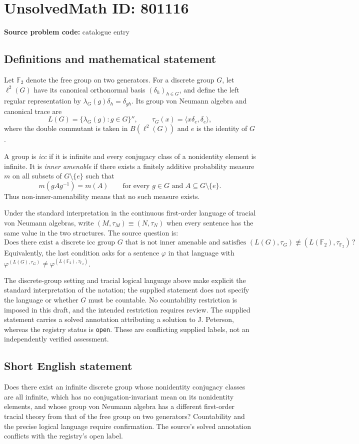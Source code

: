 \documentclass[11pt]{article}
\begin{document}
\section*{UnsolvedMath ID: 801116}
\textbf{Source problem code:} catalogue entry
\subsection{Definitions and mathematical statement}
Let \(\mathbb F_2\) denote the free group on two generators. For a discrete group \(G\), let \(\ell^2(G)\) have its canonical orthonormal basis \((\delta_h)_{h\in G}\), and define the left regular representation by \(\lambda_G(g)\delta_h=\delta_{gh}\). Its group von Neumann algebra and canonical trace are
\[
L(G)=\{\lambda_G(g):g\in G\}'',\qquad \tau_G(x)=\langle x\delta_e,\delta_e\rangle,
\]
where the double commutant is taken in \(B(\ell^2(G))\) and \(e\) is the identity of \(G\).

A group is \emph{icc} if it is infinite and every conjugacy class of a nonidentity element is infinite. It is \emph{inner amenable} if there exists a finitely additive probability measure \(m\) on all subsets of \(G\setminus\{e\}\) such that
\[
m(gAg^{-1})=m(A)\qquad\text{for every }g\in G\text{ and }A\subseteq G\setminus\{e\}.
\]
Thus non-inner-amenability means that no such measure exists.

Under the standard interpretation in the continuous first-order language of tracial von Neumann algebras, write \((M,\tau_M)\equiv(N,\tau_N)\) when every sentence has the same value in the two structures. The source question is:
\[
\text{Does there exist a discrete icc group }G\text{ that is not inner amenable and satisfies }
(L(G),\tau_G)\not\equiv(L(\mathbb F_2),\tau_{\mathbb F_2})\,?
\]
Equivalently, the last condition asks for a sentence \(\varphi\) in that language with \(\varphi^{(L(G),\tau_G)}\ne\varphi^{(L(\mathbb F_2),\tau_{\mathbb F_2})}\).

The discrete-group setting and tracial logical language above make explicit the standard interpretation of the notation; the supplied statement does not specify the language or whether \(G\) must be countable. No countability restriction is imposed in this draft, and the intended restriction requires review. The supplied statement carries a solved annotation attributing a solution to J. Peterson, whereas the registry status is \texttt{open}. These are conflicting supplied labels, not an independently verified assessment.
\subsection{Short English statement}
Does there exist an infinite discrete group whose nonidentity conjugacy classes are all infinite, which has no conjugation-invariant mean on its nonidentity elements, and whose group von Neumann algebra has a different first-order tracial theory from that of the free group on two generators? Countability and the precise logical language require confirmation. The source's solved annotation conflicts with the registry's open label.
\end{document}
